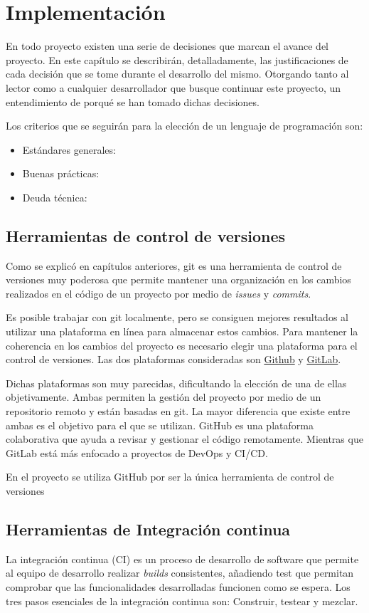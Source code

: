 \chapter{Implementación}
En todo proyecto existen una serie de decisiones que marcan el avance del proyecto. En este capítulo se describirán, detalladamente, las justificaciones de cada decisión que se tome durante el desarrollo del mismo. Otorgando tanto al lector como a cualquier desarrollador que busque continuar este proyecto, un entendimiento de porqué se han tomado dichas decisiones.

Los criterios que se seguirán para la elección de un lenguaje de programación son: 
\begin{itemize}
    \item Estándares generales: 
    \item Buenas prácticas:
    \item Deuda técnica: 
\end{itemize}

\section{Herramientas de control de versiones}
Como se explicó en capítulos anteriores, \Gls{git} es una herramienta de control de versiones muy poderosa que permite mantener una organización en los cambios realizados en el código de un proyecto por medio de \emph{issues} y \emph{commits}.

Es posible trabajar con \Gls{git} localmente, pero se consiguen mejores resultados al utilizar una plataforma en línea para almacenar estos cambios. Para mantener la coherencia en los cambios del proyecto es necesario elegir una plataforma para el control de versiones. Las dos plataformas consideradas son \href{}{Github} y \href{}{GitLab}. 

Dichas plataformas son muy parecidas, dificultando la elección de una de ellas objetivamente. Ambas permiten la gestión del proyecto por medio de un repositorio remoto y están basadas en \Gls{git}. La mayor diferencia que existe entre ambas es el objetivo para el que se utilizan. GitHub es una plataforma colaborativa que ayuda a revisar y gestionar el código remotamente. Mientras que GitLab está más enfocado a proyectos de DevOps y CI/CD. \cite{VCS2022}

En el proyecto se utiliza GitHub por ser la única herramienta de control de versiones  

\section{Herramientas de Integración continua}
La integración continua (CI) es un proceso de desarrollo de software que permite al equipo de desarrollo realizar \emph{builds} consistentes, añadiendo test que permitan comprobar que las funcionalidades desarrolladas funcionen como se espera. Los tres pasos esenciales de la integración continua son: Construir, testear y mezclar. \cite{virtanen2021comparing}


